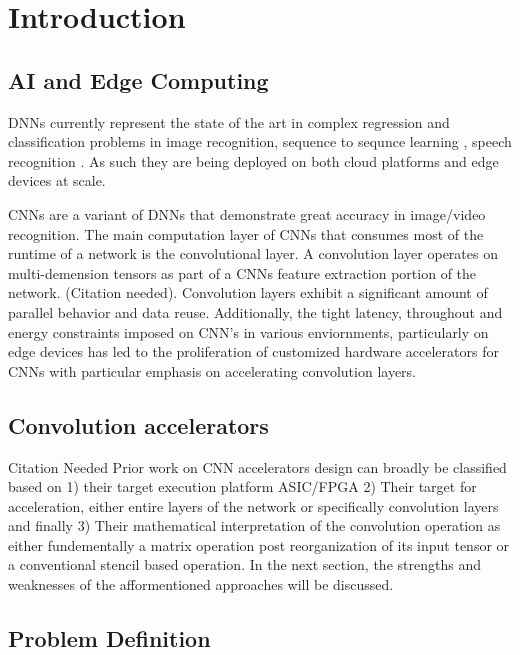 
\chapter{Introduction}

\section{AI and Edge Computing}
\label{chap:intro:ai_and_edge}

\ac{DNN}s currently represent the state of the art in complex regression and
classification problems in image recognition, sequence to sequnce learning
\cite{dnn_is_sota_seq2seq}, speech recognition \cite{dnn_is_sota_speech}. As
such they are being deployed on both cloud platforms and edge devices at scale.

\ac{CNN}s are a variant of \ac{DNN}s that demonstrate great accuracy in
image/video recognition. The main computation layer of \ac{CNN}s that consumes
most of the runtime of a network is the convolutional layer. A convolution layer
operates on multi-demension tensors as part of a \ac{CNN}s feature extraction
portion of the network. (Citation needed). Convolution layers exhibit a
significant amount of parallel behavior and data reuse. Additionally, the tight
latency, throughout and energy constraints imposed on CNN's in various
enviornments, particularly on edge devices has led to the proliferation of
customized hardware accelerators for \ac{CNN}s with particular emphasis on
accelerating convolution layers. 


\section{Convolution accelerators}
\label{chap:intro:cnn_accelerator_design_approaches}

Citation Needed Prior work on \ac{CNN} accelerators design can broadly be
classified based on 1) their target execution platform \ac{ASIC}/\ac{FPGA} 2)
Their target for acceleration, either entire layers of the network or
specifically convolution layers and finally 3) Their mathematical interpretation
of the convolution operation as either fundementally a matrix operation post
reorganization of its input tensor or a conventional stencil based operation. In
the next section, the strengths and weaknesses of the afformentioned approaches
will be discussed.

\section{Problem Definition}
\label{chap:intro:prob_def}

